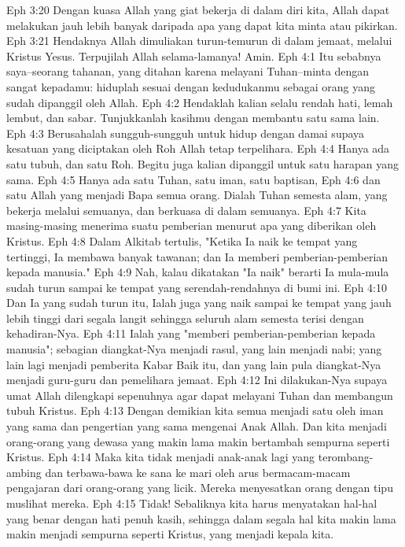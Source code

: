Eph 3:20  Dengan kuasa Allah yang giat bekerja di dalam diri kita, Allah dapat melakukan jauh lebih banyak daripada apa yang dapat kita minta atau pikirkan.
Eph 3:21  Hendaknya Allah dimuliakan turun-temurun di dalam jemaat, melalui Kristus Yesus. Terpujilah Allah selama-lamanya! Amin.
Eph 4:1  Itu sebabnya saya--seorang tahanan, yang ditahan karena melayani Tuhan--minta dengan sangat kepadamu: hiduplah sesuai dengan kedudukanmu sebagai orang yang sudah dipanggil oleh Allah.
Eph 4:2  Hendaklah kalian selalu rendah hati, lemah lembut, dan sabar. Tunjukkanlah kasihmu dengan membantu satu sama lain.
Eph 4:3  Berusahalah sungguh-sungguh untuk hidup dengan damai supaya kesatuan yang diciptakan oleh Roh Allah tetap terpelihara.
Eph 4:4  Hanya ada satu tubuh, dan satu Roh. Begitu juga kalian dipanggil untuk satu harapan yang sama.
Eph 4:5  Hanya ada satu Tuhan, satu iman, satu baptisan,
Eph 4:6  dan satu Allah yang menjadi Bapa semua orang. Dialah Tuhan semesta alam, yang bekerja melalui semuanya, dan berkuasa di dalam semuanya.
Eph 4:7  Kita masing-masing menerima suatu pemberian menurut apa yang diberikan oleh Kristus.
Eph 4:8  Dalam Alkitab tertulis, "Ketika Ia naik ke tempat yang tertinggi, Ia membawa banyak tawanan; dan Ia memberi pemberian-pemberian kepada manusia."
Eph 4:9  Nah, kalau dikatakan "Ia naik" berarti Ia mula-mula sudah turun sampai ke tempat yang serendah-rendahnya di bumi ini.
Eph 4:10  Dan Ia yang sudah turun itu, Ialah juga yang naik sampai ke tempat yang jauh lebih tinggi dari segala langit sehingga seluruh alam semesta terisi dengan kehadiran-Nya.
Eph 4:11  Ialah yang "memberi pemberian-pemberian kepada manusia"; sebagian diangkat-Nya menjadi rasul, yang lain menjadi nabi; yang lain lagi menjadi pemberita Kabar Baik itu, dan yang lain pula diangkat-Nya menjadi guru-guru dan pemelihara jemaat.
Eph 4:12  Ini dilakukan-Nya supaya umat Allah dilengkapi sepenuhnya agar dapat melayani Tuhan dan membangun tubuh Kristus.
Eph 4:13  Dengan demikian kita semua menjadi satu oleh iman yang sama dan pengertian yang sama mengenai Anak Allah. Dan kita menjadi orang-orang yang dewasa yang makin lama makin bertambah sempurna seperti Kristus.
Eph 4:14  Maka kita tidak menjadi anak-anak lagi yang terombang-ambing dan terbawa-bawa ke sana ke mari oleh arus bermacam-macam pengajaran dari orang-orang yang licik. Mereka menyesatkan orang dengan tipu muslihat mereka.
Eph 4:15  Tidak! Sebaliknya kita harus menyatakan hal-hal yang benar dengan hati penuh kasih, sehingga dalam segala hal kita makin lama makin menjadi sempurna seperti Kristus, yang menjadi kepala kita.

